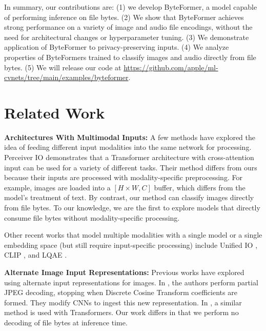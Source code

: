 In summary, our contributions are: (1) we develop ByteFormer, a model capable of performing inference on file bytes. (2) We show that ByteFormer achieves strong performance on a variety of image and audio file encodings, without the need for architectural changes or hyperparameter tuning. (3) We demonstrate application of ByteFormer to privacy-preserving inputs. (4) We analyze properties of ByteFormers trained to classify images and audio directly from file bytes. (5) We will release our code at \url{https://github.com/apple/ml-cvnets/tree/main/examples/byteformer}.

\section{Related Work} \label{sec:related-work}

\textbf{Architectures With Multimodal Inputs:} A few methods have explored the idea of feeding different input modalities into the same network for processing. Perceiver IO \cite{perceiverio} demonstrates that a Transformer \cite{transformer} architecture with cross-attention input can be used for a variety of different tasks. Their method differs from ours because their inputs are processed with modality-specific preprocessing. For example, images are loaded into a $[H \times W, C]$ buffer, which differs from the model's treatment of text. By contrast, our method can classify images directly from file bytes. To our knowledge, we are the first to explore models that directly consume file bytes without modality-specific processing.

Other recent works that model multiple modalities with a single model or a single embedding space (but still require input-specific processing) include Unified IO \cite{unifiedio}, CLIP \cite{clip}, and LQAE \cite{lqae}.

\textbf{Alternate Image Input Representations:}
Previous works have explored using alternate input representations for images. In \cite{fasterfromjpeg}, the authors perform partial JPEG decoding, stopping when Discrete Cosine Transform \cite{dct} coefficients are formed. They modify CNNs \cite{resnet} to ingest this new representation. In \cite{rgbnomore}, a similar method is used with Transformers. Our work differs in that we perform no decoding of file bytes at inference time.

